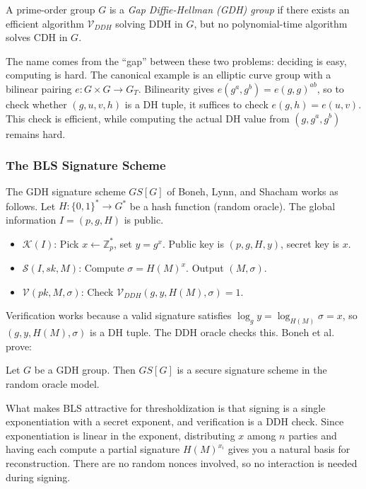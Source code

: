 \begin{definition}
A prime-order group $G$ is a \emph{Gap Diffie-Hellman (GDH) group} if there exists an
efficient algorithm $\mathcal{V}_{DDH}$ solving DDH in $G$, but no polynomial-time
algorithm solves CDH in $G$.
\end{definition}

The name comes from the ``gap'' between these two problems: deciding is easy, computing
is hard. The canonical example is an elliptic curve group with a bilinear pairing
$e: G \times G \to G_T$. Bilinearity gives $e(g^a, g^b) = e(g, g)^{ab}$, so to check
whether $(g, u, v, h)$ is a DH tuple, it suffices to check $e(g, h) = e(u, v)$. This
check is efficient, while computing the actual DH value from $(g, g^a, g^b)$ remains
hard.

\subsubsection{The BLS Signature Scheme}

The GDH signature scheme $GS[G]$ of Boneh, Lynn, and Shacham \cite{BLS} works as
follows. Let $H: \{0,1\}^* \to G^*$ be a hash function (random oracle). The global
information $I = (p, g, H)$ is public.

\begin{itemize}
    \item $\mathcal{K}(I)$: Pick $x \leftarrow \mathbb{Z}_p^*$, set $y = g^x$. Public
    key is $(p, g, H, y)$, secret key is $x$.
    \item $\mathcal{S}(I, sk, M)$: Compute $\sigma = H(M)^x$. Output $(M, \sigma)$.
    \item $\mathcal{V}(pk, M, \sigma)$: Check $\mathcal{V}_{DDH}(g, y, H(M), \sigma)
    = 1$.
\end{itemize}

Verification works because a valid signature satisfies $\log_g y = \log_{H(M)} \sigma
= x$, so $(g, y, H(M), \sigma)$ is a DH tuple. The DDH oracle checks this. Boneh et al.
prove:

\begin{theorem}
Let $G$ be a GDH group. Then $GS[G]$ is a secure signature scheme in the random oracle
model.
\end{theorem}

What makes BLS attractive for thresholdization is that signing is a single
exponentiation with a secret exponent, and verification is a DDH check. Since
exponentiation is linear in the exponent, distributing $x$ among $n$ parties and having
each compute a partial signature $H(M)^{x_i}$ gives you a natural basis for
reconstruction. There are no random nonces involved, so no interaction is needed during
signing.

